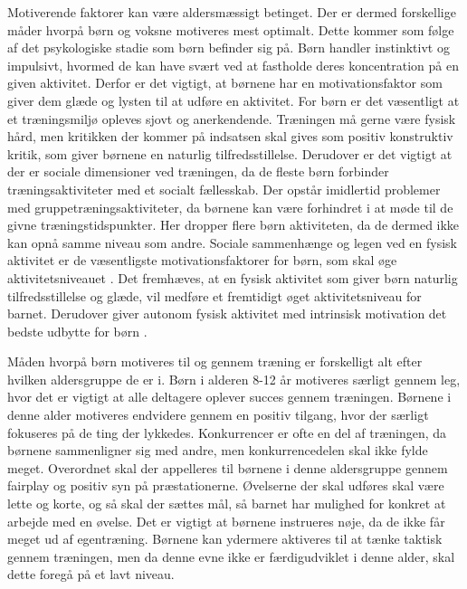 Motiverende faktorer kan være aldersmæssigt betinget. Der er dermed forskellige måder hvorpå børn og voksne motiveres mest optimalt. Dette kommer som følge af det psykologiske stadie som børn befinder sig på.  \newline
Børn handler instinktivt og impulsivt, hvormed de kan have svært ved at fastholde deres koncentration på en given aktivitet. Derfor er det vigtigt, at børnene har en motivationsfaktor som giver dem glæde og lysten til at udføre en aktivitet. \citep{V.Brown2007} \newline
For børn er det væsentligt at et træningsmiljø opleves sjovt og anerkendende. Træningen må gerne være fysisk hård, men kritikken der kommer på indsatsen skal gives som positiv konstruktiv kritik, som giver børnene en naturlig tilfredsstillelse. Derudover er det vigtigt at der er sociale dimensioner ved træningen, da de fleste børn forbinder træningsaktiviteter med et socialt fællesskab. Der opstår imidlertid problemer med gruppetræningsaktiviteter, da børnene kan være forhindret i at møde til de givne træningstidspunkter. Her dropper flere børn aktiviteten, da de dermed ikke kan opnå samme niveau som andre. \citep{Wied2011,Q.Romani2013}\newline
Sociale sammenhænge og legen ved en fysisk aktivitet er de væsentligste motivationsfaktorer for børn, som skal øge aktivitetsniveauet \citep{McWhorter2003,J.SebireJagoR.FoxEtAl2013}. Det fremhæves, at en fysisk aktivitet som giver børn naturlig tilfredsstillelse og glæde, vil medføre et fremtidigt øget aktivitetsniveau for barnet. Derudover giver autonom fysisk aktivitet med intrinsisk motivation det bedste udbytte for børn \cite{J.SebireJagoR.FoxEtAl2013}. 

Måden hvorpå børn motiveres til og gennem træning er forskelligt alt efter hvilken aldersgruppe de er i. Børn i alderen 8-12 år motiveres særligt gennem leg, hvor det er vigtigt at alle deltagere oplever succes gennem træningen. Børnene i denne alder motiveres endvidere gennem en positiv tilgang, hvor der særligt fokuseres på de ting der lykkedes. Konkurrencer er ofte en del af træningen, da børnene sammenligner sig med andre, men konkurrencedelen skal ikke fylde meget. Overordnet skal der appelleres til børnene i denne aldersgruppe gennem fairplay og positiv syn på præstationerne. Øvelserne der skal udføres skal være lette og korte, og så skal der sættes mål, så barnet har mulighed for konkret at arbejde med en øvelse. Det er vigtigt at børnene instrueres nøje, da de ikke får meget ud af egentræning. Børnene kan ydermere aktiveres til at tænke taktisk gennem træningen, men da denne evne ikke er færdigudviklet i denne alder, skal dette foregå på et lavt niveau. \citep{Wied2011} 

